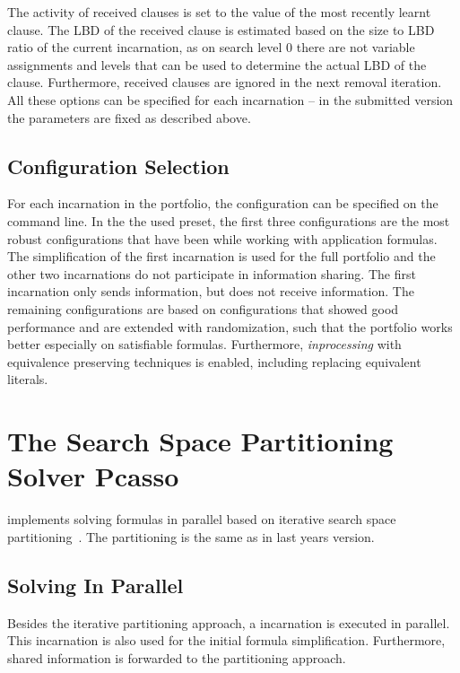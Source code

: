 \documentclass[conference]{IEEEtran}
\begin{document}
The activity of received clauses is set to the value of the most recently learnt clause. 
The LBD of the received clause is estimated based on the size to LBD ratio of the current incarnation, as on search level $0$ there are not variable assignments and levels that can be used to determine the actual LBD of the clause. 
Furthermore, received clauses are ignored in the next removal iteration. 
All these options can be specified for each incarnation -- in the submitted version the parameters are fixed as described above. 

\subsection{Configuration Selection}

For each incarnation in the portfolio, the configuration can be specified on the command line. 
In the the used preset, the first three configurations are the most robust configurations that have been while working with application formulas. 
The simplification of the first incarnation is used for the full portfolio and the other two incarnations do not participate in information sharing. 
The first incarnation only sends information, but does not receive information. 
The remaining configurations are based on configurations that showed good performance and are extended with randomization, such that the portfolio works better especially on satisfiable formulas. 
Furthermore, \emph{inprocessing} with equivalence preserving techniques is enabled, including replacing equivalent literals. 

\section{The Search Space Partitioning Solver Pcasso}

\pcasso implements solving formulas in parallel based on iterative search space partitioning~\cite{sat2012}. 
The partitioning is the same as in last years version. 

\subsection{Solving In Parallel}

Besides the iterative partitioning approach, a \priss incarnation is executed in parallel. 
This incarnation is also used for the initial formula simplification. 
Furthermore, shared information is forwarded to the partitioning approach. 
\end{document}
